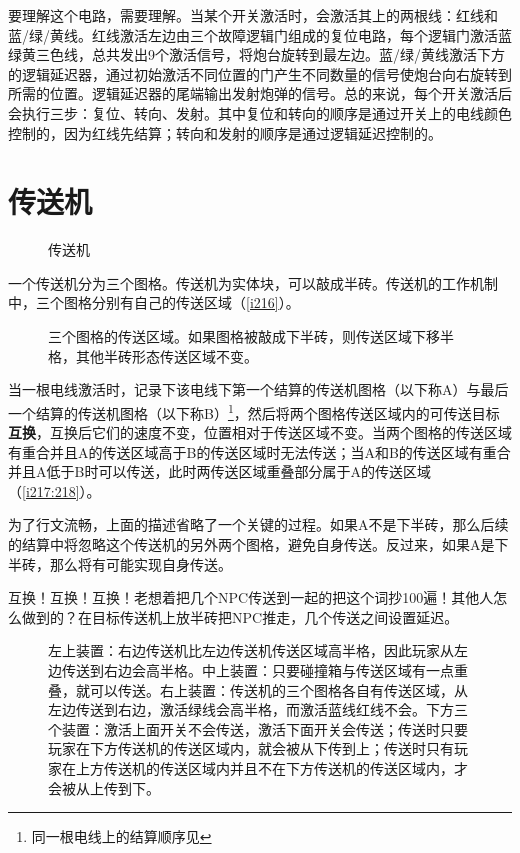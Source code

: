 要理解这个电路，需要理解。当某个开关激活时，会激活其上的两根线：红线和蓝/绿/黄线。红线激活左边由三个故障逻辑门组成的复位电路，每个逻辑门激活蓝绿黄三色线，总共发出9个激活信号，将炮台旋转到最左边。蓝/绿/黄线激活下方的逻辑延迟器，通过初始激活不同位置的门产生不同数量的信号使炮台向右旋转到所需的位置。逻辑延迟器的尾端输出发射炮弹的信号。总的来说，每个开关激活后会执行三步：复位、转向、发射。其中复位和转向的顺序是通过开关上的电线颜色控制的，因为红线先结算；转向和发射的顺序是通过逻辑延迟控制的。

\section{传送机}\label{chuansongji}
\begin{figure}[!ht]
\centering
{}
\caption{传送机}
\end{figure}
一个传送机分为三个图格。传送机为实体块，可以敲成半砖。传送机的工作机制中，三个图格分别有自己的传送区域（\autoref{i216}）。

\begin{figure}[!ht]
\centering
{}
\caption{三个图格的传送区域。如果图格被敲成下半砖，则传送区域下移半格，其他半砖形态传送区域不变。}
\label{i216}
\end{figure}

当一根电线激活时，记录下该电线下第一个结算的传送机图格（以下称A）与最后一个结算的传送机图格（以下称B）\footnote{同一根电线上的结算顺序见}，然后将两个图格传送区域内的可传送目标\textbf{互换}，互换后它们的速度不变，位置相对于传送区域不变。当两个图格的传送区域有重合并且A的传送区域高于B的传送区域时无法传送；当A和B的传送区域有重合并且A低于B时可以传送，此时两传送区域重叠部分属于A的传送区域（\autoref{i217:218}）。

为了行文流畅，上面的描述省略了一个关键的过程。如果A不是下半砖，那么后续的结算中将忽略这个传送机的另外两个图格，避免自身传送。反过来，如果A是下半砖，那么将有可能实现自身传送。

\begin{remark*}{}{}
互换！{\LARGE 互换！}{\huge 互换！}老想着把几个NPC传送到一起的把这个词抄100遍！其他人怎么做到的？在目标传送机上放半砖把NPC推走，几个传送之间设置延迟。
\end{remark*}

\begin{figure}[!ht]
\begin{center}
\end{center}
\caption{左上装置：右边传送机比左边传送机传送区域高半格，因此玩家从左边传送到右边会高半格。中上装置：只要碰撞箱与传送区域有一点重叠，就可以传送。右上装置：传送机的三个图格各自有传送区域，从左边传送到右边，激活绿线会高半格，而激活蓝线红线不会。下方三个装置：激活上面开关不会传送，激活下面开关会传送；传送时只要玩家在下方传送机的传送区域内，就会被从下传到上；传送时只有玩家在上方传送机的传送区域内并且不在下方传送机的传送区域内，才会被从上传到下。}
\label{i217:218}
\end{figure}

